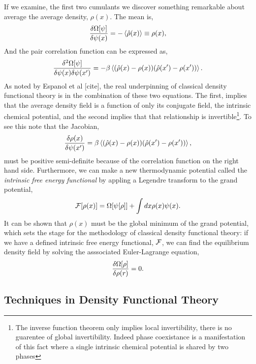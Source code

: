 If we examine, the first two cumulants we discover something remarkable about average the average density, $\rho(x)$. The mean is,
%
\begin{equation}
    \frac{\delta \Omega[\psi]}{\delta \psi(x)} = -\left\langle \hat{\rho}(x) \right\rangle \equiv \rho(x),
\end{equation}
%
And the pair correlation function can be expressed as, 
%
\begin{equation}
    \frac{\delta^2 \Omega[\psi]}{\delta \psi(x) \delta \psi(x^\prime)} = - \beta \left\langle (\hat{\rho}(x) - \rho(x))(\hat{\rho}(x^\prime) - \rho(x^\prime)) \right\rangle.
\end{equation}
%
As noted by Espanol et al [cite], the real underpinning of classical density functional theory is in the combination of these two equations.
The first, implies that the average density field is a function of only its conjugate field, the intrinsic chemical potential, and the second implies that that relationship is invertible\footnote{The inverse function theorem only implies local invertibility, there is no guarentee of global invertibility. Indeed phase coexistance is a manifestation of this fact where a single intrinsic chemical potential is shared by two phases}.
To see this note that the Jacobian, 
%
\begin{equation}
    \frac{\delta \rho(x)}{\delta \psi(x^\prime)} = \beta \left\langle  (\hat{\rho}(x) - \rho(x))(\hat{\rho}(x^\prime) - \rho(x^\prime)) \right\rangle, 
\end{equation}
%
must be positive semi-definite because of the correlation function on the right 
hand side. Furthermore, we can make a new thermodynamic potential called the \textit{intrinsic free energy functional} by appling a Legendre transform to the grand potential,
%
\begin{equation}
    \mathcal{F}[\rho(x)] = \Omega[\psi[\rho]] + \int dx \rho(x) \psi(x).
\end{equation}
%
It can be shown \cite{HansenAppendixB} that $\rho(x)$ must be the global minimum of the grand potential, which sets the stage for the methodology of classical density functional theory: if we have a defined intrinsic free energy functional, $\mathcal{F}$, we can find the equilibrium density field by solving the asssociated Euler-Lagrange equation, 
%
\begin{equation}
    \frac{\delta \Omega[\rho]}{\delta \rho(r)} = 0.
\end{equation}

\subsection{Techniques in Density Functional Theory} %

